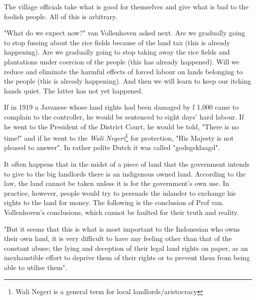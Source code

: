 The village officials take what is good for themselves and give what is bad to the foolish people. All of this is arbitrary.\vskip 0.2in

"What do we expect now?" van Vollenhoven asked next. Are we gradually going to stop 
fussing about the rice fields because of the land tax (this is already happening). 
Are we gradually going to stop taking away the rice fields and plantations under 
coercion of the people (this has already happened). Will we reduce and eliminate 
the harmful effects of forced labour on lands belonging to the people (this is already happening). 
And then we will learn to keep our itching hands quiet. The latter has not yet happened.\vskip 0.2in

If in 1919 a Javanese whose land rights had been damaged by f 1,000 came to complain to 
the controller, he would be sentenced to eight days' hard labour. If he went to the President of 
the District Court, he would be told, "There is no time!" and if he went to the \emph{Wali Negeri}\footnote[6]{Wali Negeri is a general term for local landlords/aristocracy} 
for protection, "His Majesty is not pleased to answer". In rather polite Dutch it was called "godsgeklaagd".

It often happens that in the midst of a piece of land that the government intends 
to give to the big landlords there is an indigenous owned land. According to the law, 
the land cannot be taken unless it is for the government's own use. In practice, 
however, people would try to persuade the inlander to exchange his rights to the land for money.
The following is the conclusion of Prof van. Vollenhoven's conclusions, which cannot be faulted for their truth and reality.\vskip 0.2in

"But it seems that this is what is most important to the Indonesian who owns their own land, 
it is very difficult to have any feeling other than that of the constant abuse; the lying and 
deception of their legal land rights on paper, as an inexhaustible effort to deprive them of 
their rights or to prevent them from being able to utilise them".\vskip 0.2in